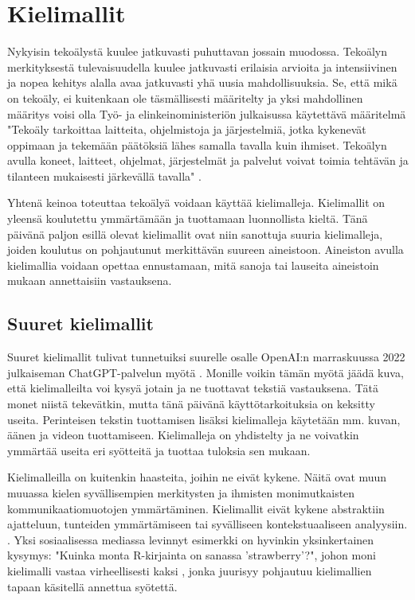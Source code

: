 \chapter{Kielimallit}
\label{ch:kielimallit}

Nykyisin tekoälystä kuulee jatkuvasti puhuttavan jossain muodossa. Tekoälyn
merkityksestä tulevaisuudella kuulee jatkuvasti erilaisia arvioita ja
intensiivinen ja nopea kehitys alalla avaa jatkuvasti yhä uusia
mahdollisuuksia. Se, että mikä on tekoäly, ei kuitenkaan ole täsmällisesti
määritelty ja yksi mahdollinen määritys voisi olla Työ- ja elinkeinoministeriön
julkaisussa käytettävä määritelmä "Tekoäly tarkoittaa laitteita, ohjelmistoja
ja järjestelmiä, jotka kykenevät oppimaan ja tekemään päätöksiä lähes samalla
tavalla kuin ihmiset. Tekoälyn avulla koneet, laitteet, ohjelmat, järjestelmät
ja palvelut voivat toimia tehtävän ja tilanteen mukaisesti järkevällä tavalla"
\parencite{valtioneuvostoSuomenTekoalyaika}.

Yhtenä keinoa toteuttaa tekoälyä voidaan käyttää kielimalleja. Kielimallit on
yleensä koulutettu ymmärtämään ja tuottamaan luonnollista kieltä. Tänä päivänä
paljon esillä olevat kielimallit ovat niin sanottuja suuria kielimalleja,
joiden koulutus on pohjautunut merkittävän suureen aineistoon. Aineiston avulla
kielimallia voidaan opettaa ennustamaan, mitä sanoja tai lauseita aineistoin
mukaan annettaisiin vastauksena.

\section{Suuret kielimallit}

Suuret kielimallit tulivat tunnetuiksi suurelle osalle OpenAI:n marraskuussa
2022 julkaiseman ChatGPT-palvelun myötä \parencite{alma9911564814005973}.
Monille voikin tämän myötä jäädä kuva, että kielimalleilta voi kysyä jotain ja
ne tuottavat tekstiä vastauksena. Tätä monet niistä tekevätkin, mutta tänä
päivänä käyttötarkoituksia on keksitty useita. Perinteisen tekstin tuottamisen
lisäksi kielimalleja käytetään mm. kuvan, äänen ja videon tuottamiseen.
Kielimalleja on yhdistelty ja ne voivatkin ymmärtää useita eri syötteitä ja
tuottaa tuloksia sen mukaan.

Kielimalleilla on kuitenkin haasteita, joihin ne eivät kykene. Näitä ovat muun
muuassa kielen syvällisempien merkitysten ja ihmisten monimutkaisten
kommunikaatiomuotojen ymmärtäminen. Kielimallit eivät kykene abstraktiin
ajatteluun, tunteiden ymmärtämiseen tai syvälliseen kontekstuaaliseen
analyysiin. \parencite{haukkaJimiKuinkakielimallitOppivat}. Yksi sosiaalisessa
mediassa levinnyt esimerkki on hyvinkin yksinkertainen kysymys: "Kuinka monta
R-kirjainta on sanassa 'strawberry'?", johon moni kielimalli vastaa
virheellisesti kaksi \parencite{alberttechStrawberry}, jonka juurisyy pohjautuu
kielimallien tapaan käsitellä annettua syötettä.

